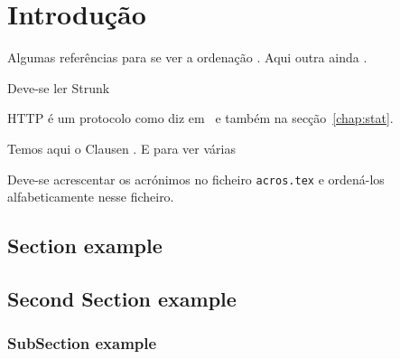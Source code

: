 \chapter{Introdução}\label{chap:intro}

Algumas referências para se ver a ordenação  \cite{yaacoub2012}. Aqui outra ainda \cite{etsitr102732}.

Deve-se ler Strunk~\cite{strunk2007elements}

\ac{HTTP} é um protocolo como diz em~\cite{test2000} e também na secção~\ref{chap:stat}.

  Temos aqui o Clausen \cite{Clausen2003}. E para ver várias \cite{yaacoub2012, etsitr102732, strunk2007elements}

Deve-se acrescentar os acrónimos no ficheiro \texttt{acros.tex} e ordená-los alfabeticamente nesse ficheiro.


\section{Section example}
\lipsum[1-6]
\section{Second Section example}
\subsection{SubSection example}
\lipsum[7-10]

